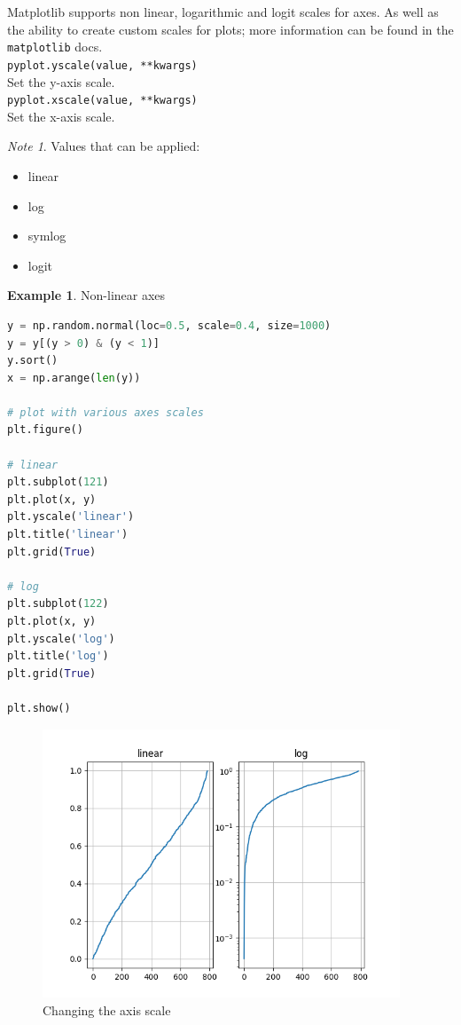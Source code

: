 \documentclass{article}
\theoremstyle{definition}
\newtheorem{ex}{Example}[subsection]
\theoremstyle{remark}
\newtheorem*{nb}{Note}
\newcommand{\func}[2]{\noindent\lstinline{#1}\\#2}
\begin{document}
Matplotlib supports non linear, logarithmic and logit scales for axes. As well as the ability to create custom scales for plots; more information can be found in the \lstinline{matplotlib} docs.\\

\func{pyplot.yscale(value, **kwargs)}{Set the y-axis scale.\\}

\func{pyplot.xscale(value, **kwargs)}{Set the x-axis scale.\\}

\begin{nb}
Values that can be applied:

\begin{itemize}
    \item linear

    \item log

    \item symlog

    \item logit
\end{itemize}
\end{nb}

\hfill

\begin{ex}Non-linear axes
\begin{lstlisting}[language=Python]
y = np.random.normal(loc=0.5, scale=0.4, size=1000)
y = y[(y > 0) & (y < 1)]
y.sort()
x = np.arange(len(y))

# plot with various axes scales
plt.figure()

# linear
plt.subplot(121)
plt.plot(x, y)
plt.yscale('linear')
plt.title('linear')
plt.grid(True)

# log
plt.subplot(122)
plt.plot(x, y)
plt.yscale('log')
plt.title('log')
plt.grid(True)

plt.show()
\end{lstlisting}

\begin{figure}[h]
    \centering
    \includegraphics[width=\textwidth, height=8cm]{matplotlib_axis_scale}
    \caption{Changing the axis scale}
    \label{fig:mpl_axis_scale}
\end{figure}
\end{ex}
\end{document}
